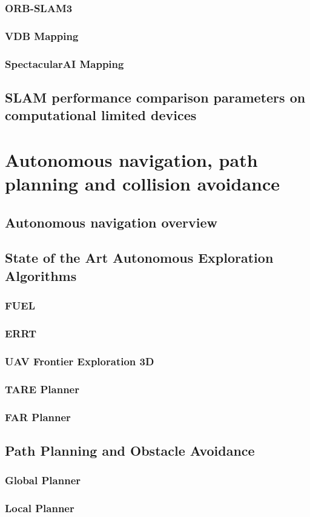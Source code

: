\subsubsection{ORB-SLAM3}

\subsubsection{VDB Mapping}

\subsubsection{SpectacularAI Mapping}



\subsection{SLAM performance comparison parameters on computational limited devices}

\section{Autonomous navigation, path planning and collision avoidance}

\subsection{Autonomous navigation overview}

\subsection{State of the Art Autonomous Exploration Algorithms}

\subsubsection{FUEL}

\subsubsection{ERRT}

\subsubsection{UAV Frontier Exploration 3D}

\subsubsection{TARE Planner}

\subsubsection{FAR Planner}

\subsection{Path Planning and Obstacle Avoidance}

\subsubsection{Global Planner}

\subsubsection{Local Planner}